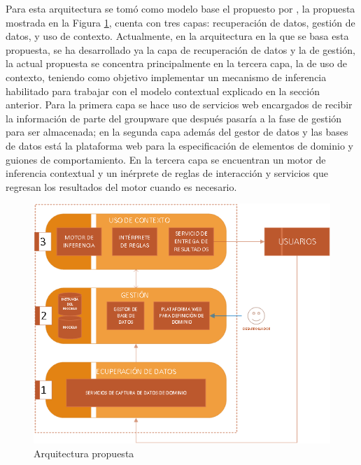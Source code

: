 Para esta arquitectura se tom\'o como modelo base el propuesto por \cite{montane2013context}, la propuesta mostrada en la Figura \ref{ARCH:propuesta}, cuenta con tres capas: recuperaci\'on de datos, gesti\'on de datos, y uso de contexto. Actualmente, en la arquitectura en la que se basa esta propuesta, se ha desarrollado ya la capa de recuperaci\'on de datos y la de gesti\'on, la actual propuesta se concentra principalmente en la tercera capa, la de uso de contexto, teniendo como objetivo implementar un mecanismo de inferencia habilitado para trabajar con el modelo contextual explicado en la secci\'on anterior. Para la primera capa se hace uso de servicios web encargados de recibir la informaci\'on de parte del groupware que despu\'es pasar\'ia a la fase de gesti\'on para ser almacenada; en la segunda capa adem\'as del gestor de datos y las bases de datos est\'a la plataforma web para la especificaci\'on de elementos de dominio y guiones de comportamiento. En la tercera capa se encuentran un motor de inferencia contextual y un in\'erprete de reglas de interacci\'on y servicios que regresan los resultados del motor cuando es necesario.

\newpage

\begin{figure}[h!]
\centering
\includegraphics[scale=0.70]{images/arquitecturav2}
\caption{Arquitectura propuesta}
\label{ARCH:propuesta}
\end{figure}

